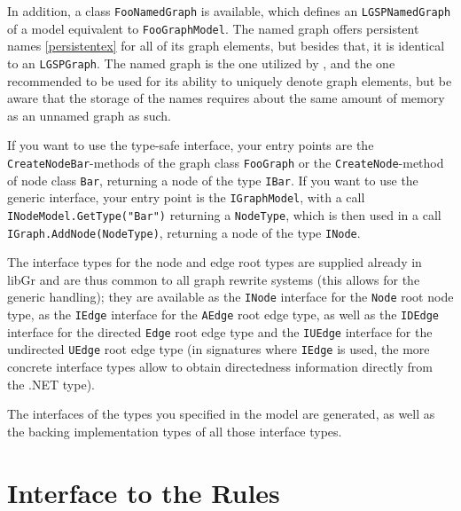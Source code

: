 In addition, a class \texttt{FooNamedGraph} is available, which defines an \texttt{LGSPNamedGraph} of a model equivalent to \texttt{FooGraphModel}.
The named graph offers persistent names \ref{persistentex} for all of its graph elements, but besides that, it is identical to an \texttt{LGSPGraph}.
The named graph is the one utilized by \GrShell, and the one recommended to be used for its ability to uniquely denote graph elements,
but be aware that the storage of the names requires about the same amount of memory as an unnamed graph as such.

\begin{note}
If you want to use the type-safe interface, your entry points are the \texttt{CreateNodeBar}-methods of the graph class \texttt{FooGraph} or the \texttt{CreateNode}-method of node class \texttt{Bar}, returning a node of the type \texttt{IBar}.
If you want to use the generic interface, your entry point is the \texttt{IGraphModel}, with a call \texttt{INodeModel.GetType("Bar")} returning a \texttt{NodeType}, which is then used in a call \texttt{IGraph.AddNode(NodeType)}, returning a node of the type \texttt{INode}.
\end{note}

The interface types for the node and edge root types are supplied already in libGr and are thus common to all graph rewrite systems (this allows for the generic handling); 
they are available as the \texttt{INode} interface for the \texttt{Node} root node type, 
as the \texttt{IEdge} interface for the \texttt{AEdge} root edge type, 
as well as the \texttt{IDEdge} interface for the directed \texttt{Edge} root edge type and the \texttt{IUEdge} interface for the undirected \texttt{UEdge} root edge type 
(in signatures where \texttt{IEdge} is used, the more concrete interface types allow to obtain directedness information directly from the .NET type).

The interfaces of the types you specified in the model are generated, as well as the backing implementation types of all those interface types.

\pagebreak

\section{Interface to the Rules}

